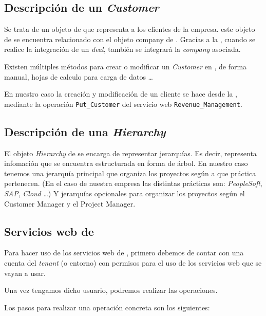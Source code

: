 \subsection{Descripción de un \textit{Customer}}
Se trata de un objeto de \wday{} que representa a los clientes de la empresa. este objeto de \wday{} se encuentra relacionado con el objeto company de \hs. 
Gracias a la \iface{}, cuando se realice la integración de un \textit{deal}, también se integrará la \textit{company} asociada.

Existen múltiples métodos para crear o modificar un \textit{Customer} en \wday{}, de forma manual, hojas de calculo para carga de datos \ldots

En nuestro caso la creación y modificación de un cliente se hace desde la \iface{}, 
mediante la operación \verb|Put_Customer| del servicio web \verb|Revenue_Management|.

\subsection{Descripción de una \textit{Hierarchy}}

El objeto \textit{Hierarchy} de \wday{} se encarga de representar jerarquías.
Es decir, representa infomación que se encuentra estructurada en forma de árbol.
En nuestro caso tenemos una jerarquía principal que organiza los proyectos según a que práctica pertenecen. 
(En el caso de nuestra empresa las distintas prácticas son: \textit{PeopleSoft}, \textit{SAP}, \textit{Cloud} \ldots)
Y jerarquías opcionales para organizar los proyectos según el Customer Manager y el Project Manager.

\subsection{Servicios web de \wday{}}

Para hacer uso de los servicios web de \wday{}, primero debemos de contar con una cuenta del \textit{tenant} (o entorno) con permisos para el uso de los servicios web que se vayan a usar.

Una vez tengamos dicho usuario, podremos realizar las operaciones.

Los pasos para realizar una operación concreta son los siguientes:

